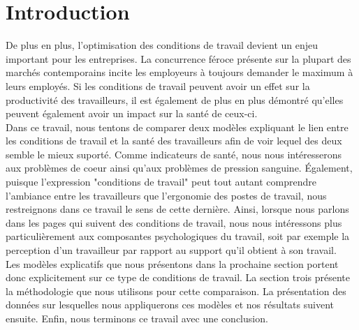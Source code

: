 \documentclass[a4paper, oneside, titlepage]{article}
\begin{document}
\section{Introduction}
De plus en plus, l'optimisation des conditions de travail devient un enjeu important pour les entreprises. La concurrence féroce présente sur la plupart des marchés contemporains incite les employeurs à toujours demander le maximum à leurs employés. Si les conditions de travail peuvent avoir un effet sur la productivité des travailleurs, il est également de plus en plus démontré qu'elles peuvent également avoir un impact sur la santé de ceux-ci.
\\
Dans ce travail, nous tentons de comparer deux modèles expliquant le lien entre les conditions de travail et la santé des travailleurs afin de voir lequel des deux semble le mieux suporté. Comme indicateurs de santé, nous nous intéresserons aux problèmes de coeur ainsi qu'aux problèmes de pression sanguine. Également, puisque l'expression "conditions de travail" peut tout autant comprendre l'ambiance entre les travailleurs que l'ergonomie des postes de travail, nous restreignons dans ce travail le sens de cette dernière. Ainsi, lorsque nous parlons dans les pages qui suivent des conditions de travail, nous nous intéressons plus particulièrement aux composantes psychologiques du travail, soit par exemple la perception d'un travailleur par rapport au support qu'il obtient à son travail. 
\\
Les modèles explicatifs que nous présentons dans la prochaine section portent donc explicitement sur ce type de conditions de travail. La section trois présente la méthodologie que nous utilisons pour cette comparaison. La présentation des données sur lesquelles nous appliquerons ces modèles et nos résultats suivent ensuite. Enfin, nous terminons ce travail avec une conclusion.
\end{document}
